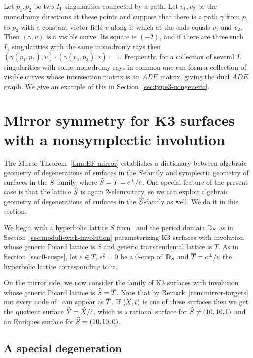 \documentclass{amsart}
\begin{document}
Let $p_1,p_2$ be two $I_1$ singularities connected by a path. Let
$v_1,v_2$ be the monodromy directions at these points and suppose that
there is a path $\gamma$ from $p_1$ to $p_2$ with a constant vector
field $v$ along it which at the ends equals $v_1$ and $v_2$. Then
$(\gamma,v)$ is a visible curve. Its square is $(-2)$, and if there
are three such $I_1$ singularities with the same monodromy rays then
$(\gamma(p_1,p_2), v) \cdot (\gamma(p_2,p_3), v)=1$.
Frequently, for a collection of several $I_1$ singularities with some
monodromy rays in common one can form a collection of visible curves
whose intersection matrix is an $ADE$ matrix, giving the dual $ADE$
graph. We give an example of this in Section~\ref{sec:type3-nongeneric}.

\section{Mirror symmetry for K3 surfaces with a nonsymplectic
  involution}
\label{sec:mirror-with-involution}

The Mirror Theorem~\ref{thm:EF-mirror} establishes a dictionary
between algebraic geometry of degenerations of surfaces in the
$S$-family and symplectic geometry of surfaces in the ${\widehat S}$-family,
where ${\widehat S} = {\overline T} = e^\perp/e$. One special feature of the present case
is that the lattice ${\widehat S}$ is again $2$-elementary, so we can exploit
algebraic geometry of degenerations of surfaces in the
${\widehat S}$-family as well. We do it in this section.

\smallskip

We begin with a hyperbolic lattice $S$ from \fign\ and the period
domain ${\mathbb D}_S$ as in Section~\ref{sec:moduli-with-involution} parameterizing
K3 surfaces with involution whose generic Picard lattice is $S$ and
generic transcendental lattice is $T$. As in
Section~\ref{sec:0-cusps}, let $e\in T$, $e^2=0$ be a $0$-cusp
of~${\mathbb D}_S$ and ${\overline T}=e^\perp/e$ the hyperbolic lattice corresponding to
it.

On the mirror side, we now consider the family of K3 surfaces with
involution whose generic Picard lattice is ${\widehat S} = {\overline T}$.  Note that by
Remark~\ref{rem:mirror-targets} not every node of \fign\ can appear as
${\overline T}$.  If $({\widehat X},\hat \iota)$ is one of these surfaces then we get the
quotient surface ${\widehat Y} = {\widehat X} / \hat \iota$, which is a rational surface for
${\widehat S}\ne (10,10,0)$ and an Enriques surface for ${\widehat S}=(10,10,0)$.


\subsection{A special degeneration}
\label{sec:special-degeneration}
\end{document}

